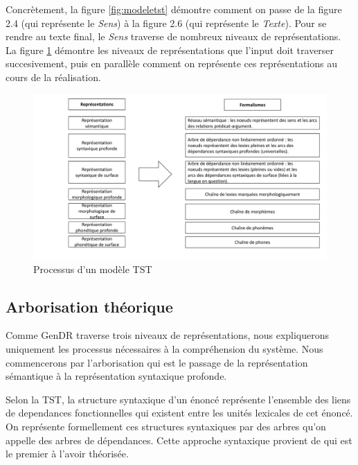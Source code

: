 Concrètement, la figure \ref{fig:modeletst} démontre comment on passe de la figure 2.4 (qui représente le \emph{Sens}) à la figure 2.6 (qui représente le \emph{Texte}). Pour se rendre au texte final, le \emph{Sens} traverse de nombreux niveaux de représentations. La figure \ref{fig:processustst} démontre les niveaux de représentations que l'input doit traverser succesivement, puis en parallèle comment on représente ces représentations au cours de la réalisation.
\begin{figure}[htb]
	\centering
	\includegraphics[width=1\textwidth, trim = {0cm 0cm 0cm 0cm},clip]{ch3/figs/polguere2.pdf}
	\caption{Processus d'un modèle TST}
	\label{fig:processustst}
\end{figure}


\subsection{Arborisation théorique}\label{arbo}

Comme GenDR traverse trois niveaux de représentations, nous expliquerons uniquement les processus nécessaires à la compréhension du système. Nous commencerons par l'arborisation qui est le passage de la représentation sémantique à la représentation syntaxique profonde.

Selon la \ac{TST}, la structure syntaxique d'un énoncé représente l'ensemble des liens de dependances fonctionnelles qui existent entre les unités lexicales de cet énoncé. On représente formellement ces structures syntaxiques par des arbres qu'on appelle des arbres de dépendances. Cette approche syntaxique provient de \cite{TesniereElementssyntaxestructurale1965} qui est le premier à l'avoir théorisée.

